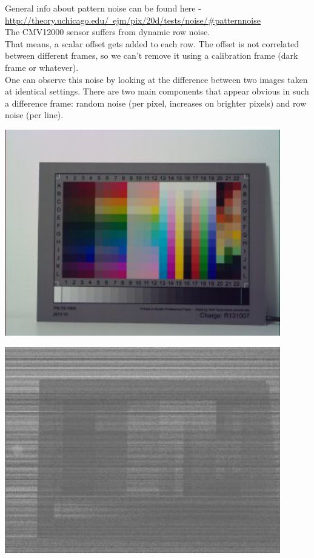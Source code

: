 General info about pattern noise can be found here - \href{http://theory.uchicago.edu/~ejm/pix/20d/tests/noise/#patternnoise}{http://theory.uchicago.edu/~ejm/pix/20d/tests/noise/\#patternnoise} \\

The CMV12000 sensor suffers from dynamic row noise.\\

That means, a scalar offset gets added to each row. The offset is not correlated between different frames, so we can't remove it using a calibration frame (dark frame or whatever).\\

One can observe this noise by looking at the difference between two images taken at identical settings. There are two main components that appear obvious in such a difference frame: random noise (per pixel, increases on brighter pixels) and row noise (per line). \\

\begin{center}
\includegraphics[height=9cm]{images/it8-gainx1-offset2047-20ms-01}
\end{center}

\begin{center}
\includegraphics[height=9cm]{images/it8-gainx1-offset2047-20ms-01-minus-02-small}
\end{center}




